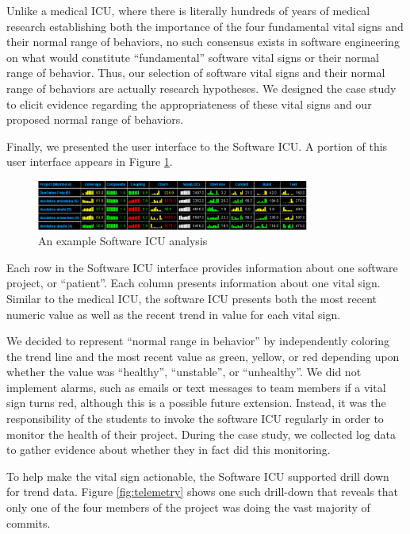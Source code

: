 \documentclass{acm_proc_article-sp}
\begin{document}
Unlike a medical ICU, where there is literally hundreds of years of medical
research establishing both the importance of the four fundamental vital
signs and their normal range of behaviors, no such consensus exists in
software engineering on what would constitute ``fundamental'' software
vital signs or their normal range of behavior.  Thus, our selection of
software vital signs and their normal range of behaviors are actually
research hypotheses.  We designed the case study to elicit evidence
regarding the appropriateness of these vital signs and our proposed normal
range of behaviors.

Finally, we presented the user interface to the Software ICU. A portion of
this user interface appears in Figure \ref{fig:sicu}.

\begin{figure}[ht]
  \center
  \includegraphics[width=0.8\textwidth]{portfolio-2008.eps}
  \caption{An example Software ICU analysis}
  \label{fig:sicu}
\end{figure} 

Each row in the Software ICU interface provides information about one
software project, or ``patient''.  Each column presents information about
one vital sign. Similar to the medical ICU, the software ICU presents both
the most recent numeric value as well as the recent trend in value for each
vital sign.

We decided to represent ``normal range in behavior'' by independently
coloring the trend line and the most recent value as green, yellow, or red
depending upon whether the value was ``healthy'', ``unstable'', or
``unhealthy''.  We did not implement alarms, such as emails or text
messages to team members if a vital sign turns red, although this is a
possible future extension.  Instead, it was the responsibility of the
students to invoke the software ICU regularly in order to monitor the
health of their project.  During the case study, we collected log data to
gather evidence about whether they in fact did this monitoring.

To help make the vital sign actionable, the Software ICU supported drill
down for trend data.  Figure \ref{fig:telemetry} shows one such drill-down
that reveals that only one of the four members of the project was doing the
vast majority of commits.
\end{document}
